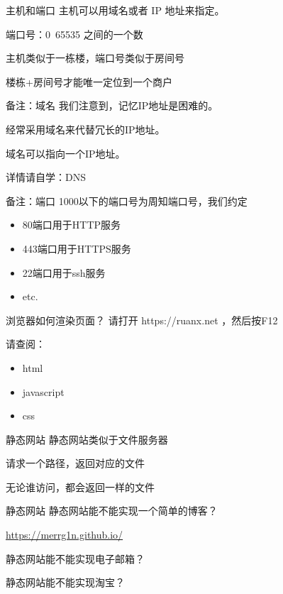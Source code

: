 \documentclass[UTF8]{ctexbeamer}
\begin{document}
\begin{frame}{主机和端口}
    主机可以用域名或者 IP 地址来指定。
    
    端口号：0~65535 之间的一个数
    
    \vspace{2em}
    
    主机类似于一栋楼，端口号类似于房间号
    
    楼栋+房间号才能唯一定位到一个商户

\end{frame}
\begin{frame}{备注：域名}
    我们注意到，记忆IP地址是困难的。
    
    经常采用域名来代替冗长的IP地址。
    
    \vspace{1em}
    
    域名可以指向一个IP地址。
    
    详情请自学：DNS

\end{frame}
\begin{frame}{备注：端口}
    1000以下的端口号为周知端口号，我们约定
    \begin{itemize}
        \item 80端口用于HTTP服务
        \item 443端口用于HTTPS服务
        \item 22端口用于ssh服务
        \item etc.
    \end{itemize}

\end{frame}
\begin{frame}{浏览器如何渲染页面？}
    请打开 https://ruanx.net ，然后按F12
    
    \vspace{1em}
    
    请查阅：
    \begin{itemize}
        \item html
        \item javascript
        \item css
    \end{itemize}

\end{frame}
\begin{frame}{静态网站}
    静态网站类似于文件服务器
    
    请求一个路径，返回对应的文件
    
    无论谁访问，都会返回一样的文件
\end{frame}
\begin{frame}{静态网站}
    静态网站能不能实现一个简单的博客？
    
    \url{https://merrg1n.github.io/}
    
    静态网站能不能实现电子邮箱？
    
    静态网站能不能实现淘宝？

\end{frame}
\end{document}
